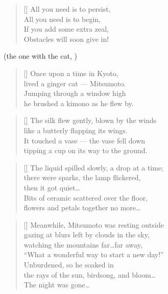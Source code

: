 \begin{multicols}{2}
	\begin{verse}[\versewidth]
		All you need is to persist,\\
		All you need is to begin,\\
		If you add some extra zeal,\\
		Obstacles will soon give in!
	\end{verse}
	
	
\end{multicols}

\clearpage
\PlainPoemTitle
{}
\vspace{-5mm}
\begin{center}
	(the one with the cat, )
\end{center}

\begin{multicols}{2}
	\begin{verse}[\versewidth]
		Once upon a time in Kyoto,\\
		lived a ginger cat --- Mitsumoto.\\
		Jumping through a window high\\
		he brushed a kimono as he flew by.
	\end{verse}
	
	\begin{verse}[\versewidth]
		The silk flew gently, blown by the winds\\
		like a butterly flapping its wings.\\
		It touched a vase --- the vase fell down\\
		tipping a cup on its way to the ground.
	\end{verse}
	
	\begin{verse}[\versewidth]
		The liquid spilled slowly, a drop at a time;\\
		there were sparks, the lamp flickered,\\
		then it got quiet\ldots\\
		Bits of ceramic scattered over the floor,\\
		flowers and petals together no more\ldots
	\end{verse}
	
	
	\begin{verse}[\versewidth]
		Meanwhile, Mitsumoto was resting outside\\
		gazing at blurs left by clouds in the sky,\\
		watching the mountains far\ldots far away,\\
		``What a wonderful way to start a new day!''\\
		Unburdened, so he soaked in\\
		the rays of the sun, birdsong, and bloom\ldots\\
		The night was gone\ldots
	\end{verse}
	


\end{multicols}
